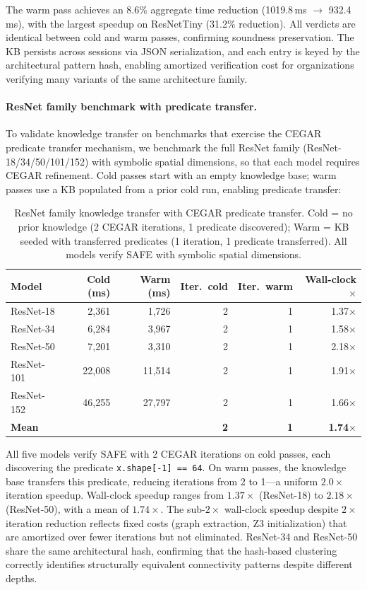 \documentclass[11pt]{article}
\begin{document}
The warm pass achieves an 8.6\% aggregate time reduction
(1019.8\,ms $\to$ 932.4\,ms), with the largest speedup on
ResNetTiny (31.2\% reduction).  All verdicts are identical between
cold and warm passes, confirming soundness preservation.
The KB persists across sessions via JSON serialization, and each
entry is keyed by the architectural pattern hash, enabling
amortized verification cost for organizations verifying many
variants of the same architecture family.

\paragraph{ResNet family benchmark with predicate transfer.}
To validate knowledge transfer on benchmarks that exercise
the CEGAR predicate transfer mechanism, we benchmark the
full ResNet family (ResNet-18/34/50/101/152) with symbolic spatial
dimensions, so that each model requires CEGAR refinement.  Cold
passes start with an empty knowledge base; warm passes use a KB
populated from a prior cold run, enabling predicate transfer:

\begin{table}[h]
\centering
\caption{ResNet family knowledge transfer with CEGAR predicate transfer.
  Cold = no prior knowledge (2 CEGAR iterations, 1 predicate discovered);
  Warm = KB seeded with transferred predicates (1 iteration, 1 predicate
  transferred).  All models verify SAFE with symbolic spatial dimensions.}
\label{tab:resnet-family-kt}
\small
\begin{tabular}{@{}lrrrrr@{}}
\toprule
\textbf{Model} & \textbf{Cold (ms)} & \textbf{Warm (ms)} &
\textbf{Iter.\ cold} & \textbf{Iter.\ warm} &
\textbf{Wall-clock $\boldsymbol{\times}$} \\
\midrule
ResNet-18  & 2,361  & 1,726  & 2 & 1 & 1.37$\times$ \\
ResNet-34  & 6,284  & 3,967  & 2 & 1 & 1.58$\times$ \\
ResNet-50  & 7,201  & 3,310  & 2 & 1 & 2.18$\times$ \\
ResNet-101 & 22,008 & 11,514 & 2 & 1 & 1.91$\times$ \\
ResNet-152 & 46,255 & 27,797 & 2 & 1 & 1.66$\times$ \\
\midrule
\textbf{Mean} & & & \textbf{2} & \textbf{1} &
\textbf{1.74$\times$} \\
\bottomrule
\end{tabular}
\end{table}

All five models verify SAFE with 2 CEGAR iterations on cold passes,
each discovering the predicate \texttt{x.shape[-1] == 64}.
On warm passes, the knowledge base transfers this predicate,
reducing iterations from 2 to 1---a uniform $2.0\times$ iteration
speedup.  Wall-clock speedup ranges from $1.37\times$ (ResNet-18)
to $2.18\times$ (ResNet-50), with a mean of $1.74\times$.
The sub-$2\times$ wall-clock speedup despite $2\times$ iteration
reduction reflects fixed costs (graph extraction, Z3 initialization)
that are amortized over fewer iterations but not eliminated.
ResNet-34 and ResNet-50 share the same architectural hash, confirming
that the hash-based clustering correctly identifies structurally
equivalent connectivity patterns despite different depths.
\end{document}
